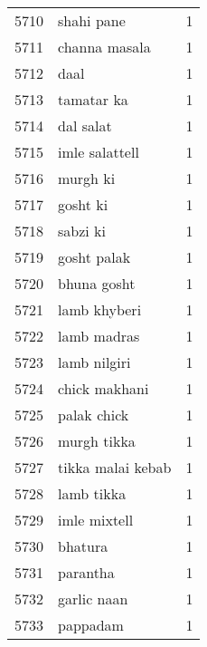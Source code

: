 \begin{tabular}{llr}
5710 &                                         shahi pane &      1 \\
5711 &                                      channa masala &      1 \\
5712 &                                               daal &      1 \\
5713 &                                         tamatar ka &      1 \\
5714 &                                          dal salat &      1 \\
5715 &                                     imle salattell &      1 \\
5716 &                                           murgh ki &      1 \\
5717 &                                           gosht ki &      1 \\
5718 &                                           sabzi ki &      1 \\
5719 &                                        gosht palak &      1 \\
5720 &                                        bhuna gosht &      1 \\
5721 &                                       lamb khyberi &      1 \\
5722 &                                        lamb madras &      1 \\
5723 &                                       lamb nilgiri &      1 \\
5724 &                                      chick makhani &      1 \\
5725 &                                        palak chick &      1 \\
5726 &                                        murgh tikka &      1 \\
5727 &                                  tikka malai kebab &      1 \\
5728 &                                         lamb tikka &      1 \\
5729 &                                       imle mixtell &      1 \\
5730 &                                            bhatura &      1 \\
5731 &                                           parantha &      1 \\
5732 &                                        garlic naan &      1 \\
5733 &                                           pappadam &      1 \\

\end{tabular}
